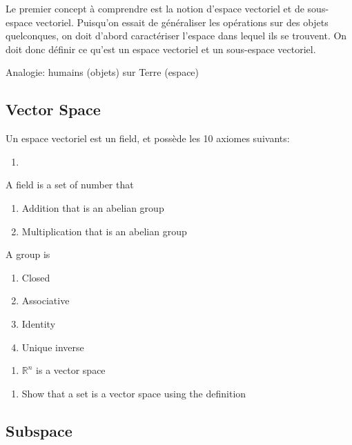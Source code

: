 \documentclass{article}
\begin{document}
Le premier concept à comprendre est la notion d'espace vectoriel et de
sous-espace vectoriel. Puisqu'on essait de généraliser les opérations
sur des objets quelconques, on doit d'abord caractériser l'espace dans
lequel ils se trouvent. On doit donc définir ce qu'est un espace vectoriel
et un sous-espace vectoriel.

Analogie: humains (objets) sur Terre (espace)

\subsection{Vector Space}%
\label{sub:Vector Space}

Un espace vectoriel est un field, et possède les 10 axiomes suivants:
\begin{enumerate}
    \item
\end{enumerate}

\begin{remark}[Field]
    A field is a set of number that
    \begin{enumerate}
	\item Addition that is an abelian group
	\item Multiplication that is an abelian group
    \end{enumerate}
    A group is
    \begin{enumerate}
        \item Closed
	\item Associative
	\item Identity
	\item Unique inverse
    \end{enumerate}
\end{remark}

\begin{proposition}
    \begin{enumerate}
        \item $\mathbb{R}^n$ is a vector space
    \end{enumerate}
\end{proposition}

\begin{problem}
    \begin{enumerate}
        \item Show that a set is a vector space using the definition
    \end{enumerate}
\end{problem}

\subsection{Subspace}%
\label{sub:Subspace}
\end{document}
